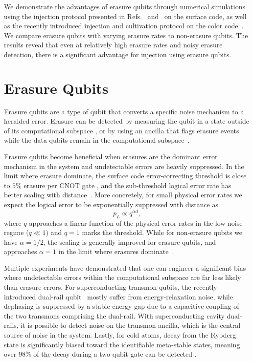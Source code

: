 \documentclass[twocolumn,
notitlepage,
aps,
prx,
floatfix,
superscriptaddress
]{revtex4-2}
\begin{document}
We demonstrate the advantages of erasure qubits through numerical simulations using the injection protocol presented in Refs.~\cite{lao2022magic} and~\cite{gidney_hook_injection} on the surface code, as well as the recently introduced injection and cultivation protocol on the color code~\cite{gidney2024magic}. We compare erasure qubits with varying erasure rates to non-erasure qubits. 
The results reveal that even at relatively high erasure rates and noisy erasure detection, there is a significant advantage for injection using erasure qubits.

\section{Erasure Qubits}
Erasure qubits are a type of qubit that converts a specific noise mechanism to a heralded error. Erasure can be detected by measuring the qubit in a state outside of its computational subspace \cite{Kubica_2023, Levine_2024, Wu_2022atoms,koottandavida2024erasure}, or by using an ancilla that flags erasure events while the data qubits remain in the computational subspace~\cite{Teoh_2023cavities}. 

Erasure qubits become beneficial when erasures are the dominant error mechanism in the system and undetectable errors are heavily suppressed. In the limit where erasure dominate, the surface code error-correcting threshold is close to $5\%$ erasure per CNOT gate \cite{Wu_2022atoms,Kubica_2023, Bailey_optimization_2024}, and the sub-threshold logical error rate has better scaling with distance~\cite{Wu_2022atoms, Bailey_optimization_2024}.
More concretely, for small physical error rates we expect the logical error to be exponentially suppressed with distance as~\cite{Fowler_2013,Bravyi_2013,Watson_2014,Bailey_optimization_2024}
\begin{equation} \label{eq:ansatz-erasure}
    p_{L} \propto q^{\alpha d},
\end{equation}
where $q$ approaches a linear function of the physical error rates in the low noise regime ($q \ll 1$) and $q=1$ marks the threshold. While for non-erasure qubits we have $\alpha=1/2$, the scaling is generally improved for erasure qubits, and approaches $\alpha=1$ in the limit where erasures dominate~\cite{Bailey_optimization_2024}.


Multiple experiments have demonstrated that one can engineer a significant bias where undetectable errors within the computational subspace are far less likely than erasure errors. For superconducting transmon qubits, the recently introduced dual-rail qubit~\cite{Kubica_2023,Teoh_2023cavities} mostly suffer from energy-relaxation noise, while dephasing is suppressed by a stable energy gap due to a capacitive coupling of the two transmons comprising the dual-rail. With superconducting cavity dual-rails, it is possible to detect noise on the transmon ancilla, which is the central source of noise in the system. Lastly, for cold atoms, decay from the Rybderg state is significantly biased toward the identifiable meta-stable states, meaning over $98 \%$ of the decay during a two-qubit gate can be detected \cite{Wu_2022atoms}.
\end{document}
